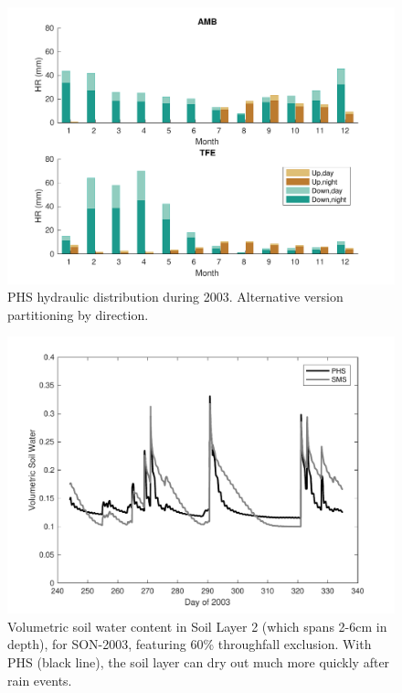\documentclass[draft,linenumbers]{agujournal}
\begin{document}
      \begin{figure}[h]
     \centering
     \includegraphics[width=30pc]{../figs2/supphr.pdf}
     \caption{PHS hydraulic distribution during 2003. Alternative version partitioning by direction.}
     \label{supp:hr2}
  \end{figure}
  \clearpage
  
     \clearpage
    \begin{figure}[h]
     \centering
     \includegraphics[width=30pc]{../figs2/supplayer2.pdf}
     \caption{Volumetric soil water content in Soil Layer 2 (which spans 2-6cm in depth), for SON-2003, featuring 60\% throughfall exclusion.
     With PHS (black line), the soil layer can dry out much more quickly after rain events.}
     \label{supp:layer2}
  \end{figure}
  
\end{document}
